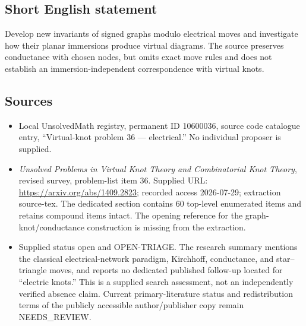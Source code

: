 \documentclass[11pt]{article}
\begin{document}
\subsection{Short English statement}
Develop new invariants of signed graphs modulo electrical moves and investigate how their planar immersions produce virtual diagrams. The source preserves conductance with chosen nodes, but omits exact move rules and does not establish an immersion-independent correspondence with virtual knots.
\subsection{Sources}
\begin{itemize}
\item Local UnsolvedMath registry, permanent ID 10600036, source code catalogue entry, ``Virtual-knot problem 36 --- electrical.'' No individual proposer is supplied.
\item \emph{Unsolved Problems in Virtual Knot Theory and Combinatorial Knot Theory}, revised survey, problem-list item 36. Supplied URL: \url{https://arxiv.org/abs/1409.2823}; recorded access 2026-07-29; extraction source-tex. The dedicated section contains 60 top-level enumerated items and retains compound items intact. The opening reference for the graph-knot/conductance construction is missing from the extraction.
\item Supplied status open and OPEN-TRIAGE. The research summary mentions the classical electrical-network paradigm, Kirchhoff, conductance, and star--triangle moves, and reports no dedicated published follow-up located for ``electric knots.'' This is a supplied search assessment, not an independently verified absence claim. Current primary-literature status and redistribution terms of the publicly accessible author/publisher copy remain NEEDS\_REVIEW.
\end{itemize}
\end{document}

